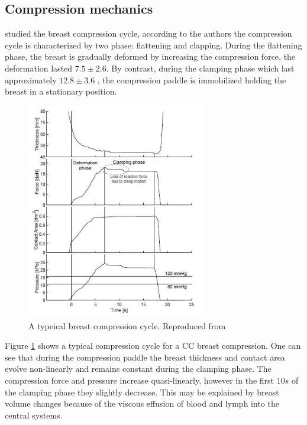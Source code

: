 \subsection{Compression mechanics} \label{subsec:compressionmechanics}
 \cite{de_pain_2015} studied the breast compression cycle, according to the authors the compression cycle is characterized by two phase: flattening and clapping. During the flattening phase, the breast is gradually  deformed by increasing the compression force, the deformation lasted  $7.5 \pm 2.6$. By contrast, during the clamping phase which last approximately $12.8 \pm 3.6$ , the compression paddle is immobilized holding the breast in a stationary position. 
\begin{figure}[!h]
\centering
\includegraphics[width=0.7\textwidth,keepaspectratio]{figures/breast_compression_cycle.jpg} 
\caption{A typeical breast compression cycle. Reproduced from \cite{groot_towards_2015}}\label{fig:breast_compression_cycle}
\end{figure}

Figure \ref{fig:breast_compression_cycle} shows a typical compression cycle for a CC breast compression. One can see that during the compression paddle the breast thickness and contact area evolve non-linearly and remains constant during the clamping phase. The compression force and pressure increase quasi-linearly, however in the first $10s$ of the clamping phase they slightly decrease. This may be explained by breast volume changes because of the viscous effusion of blood and lymph into the central systems. 

